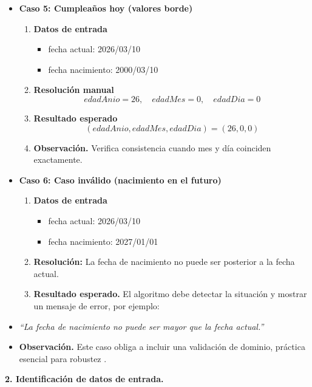 \documentclass[12pt,twoside]{book}
\begin{document}
\begin{itemize}
							\item \textbf{Caso 5: Cumpleaños hoy (valores borde)}
							
							\begin{enumerate}
								\item \textbf{Datos de entrada}
								\begin{itemize}
									\item fecha actual: 2026/03/10
									\item fecha nacimiento: 2000/03/10
								\end{itemize}
								\item \textbf{Resolución manual}
								\[
								edadAnio = 26,\quad edadMes = 0,\quad edadDia = 0
								\]
								\item \textbf{Resultado esperado}
								\[
								(edadAnio,edadMes,edadDia) = (26,0,0)
								\]
								\item \textbf{Observación.} Verifica consistencia cuando mes y día coinciden exactamente.
							\end{enumerate}
							
							\item \textbf{Caso 6: Caso inválido (nacimiento en el futuro)}
							
							\begin{enumerate}
								\item \textbf{Datos de entrada}
								\begin{itemize}
									\item fecha actual: 2026/03/10
									\item fecha nacimiento: 2027/01/01
								\end{itemize}
								\item \textbf{Resolución:} La fecha de nacimiento no puede ser posterior a la fecha actual.
								\item \textbf{Resultado esperado.} El algoritmo debe detectar la situación y mostrar un mensaje de error, por ejemplo:
							\end{enumerate}
							\item \textit{``La fecha de nacimiento no puede ser mayor que la fecha actual.''}
							\item \textbf{Observación.} Este caso obliga a incluir una validación de dominio, práctica esencial para robustez \cite{Pressman2019Software,Sommerville2015Software}.
						\end{itemize}
						
						\noindent
						\textbf{2. Identificación de datos de entrada.}
						
\end{document}

